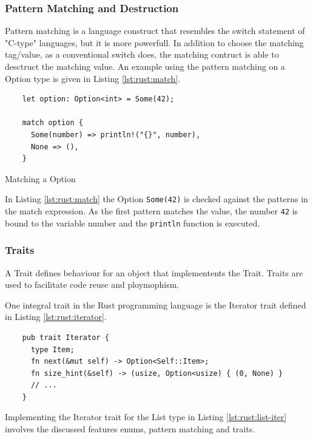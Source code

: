 \subsubsection{Pattern Matching and Destruction}

Pattern matching is a language construct that resembles the switch statement of "C-type" languages, but it is more powerfull.
In addition to choose the matching tag/value, as a conventional switch does, the matching contruct is able to desctruct the matching value.
An example using the pattern matching on a Option type is given in Listing \ref{lst:rust:match}.

\begin{listing}[H]
  \begin{verbatim}
    let option: Option<int> = Some(42);

    match option {
      Some(number) => println!("{}", number),
      None => (),
    }
  \end{verbatim}
  \caption{Matching a Option}
  \label{lst:rust:match}
\end{listing}

In Listing \ref{lst:rust:match} the Option \texttt{Some(42)} is checked against the patterns in the match expression.
As the first pattern matches the value, the number \texttt{42} is bound to the variable number and the \texttt{println} function is executed.

\subsubsection{Traits}

A Trait defines behaviour for an object that implementents the Trait.
Traits are used to facilitate code reuse and ploymophism.

One integral trait in the Rust programming language is the Iterator trait defined in Listing \ref{lst:rust:iterator}.

\begin{listing}[H]
  \begin{verbatim}
    pub trait Iterator {
      type Item;
      fn next(&mut self) -> Option<Self::Item>;
      fn size_hint(&self) -> (usize, Option<usize) { (0, None) }
      // ...
    }
  \end{verbatim}
  \caption{}
  \label{lst:rust:iterator}
\end{listing}

Implementing the Iterator trait for the List type in Listing \ref{lst:rust:list-iter} involves the discussed features enums, pattern matching and traits.

